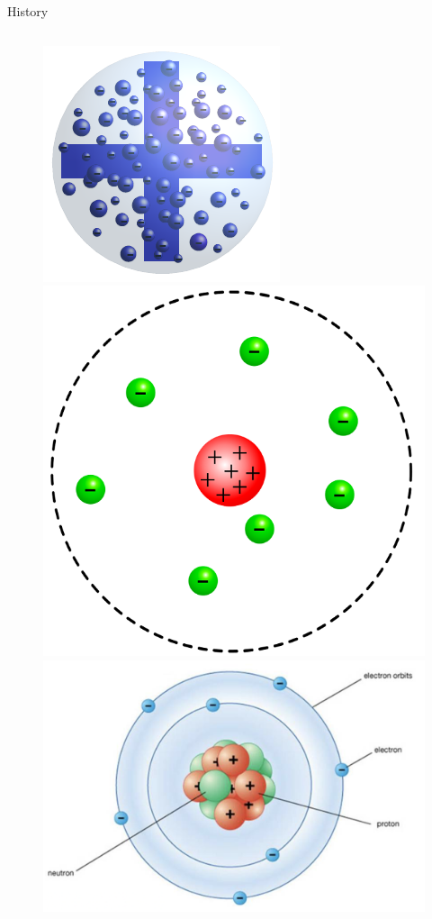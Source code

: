 \documentclass[10pt]{beamer}
\begin{document}
\begin{frame}{History}
\begin{columns}
\begin{column}{0.2\textwidth}
\begin{figure}
                \includegraphics[height=0.25\textheight]{figures/Plum_pudding_model.png}\\
                \includegraphics[height=0.25\textheight]{figures/Rutherford_model.png}\\
                \includegraphics[height=0.18\textheight]{figures/Bohr_model.png}
            \end{figure}
        \end{column}
    \end{columns}
\end{frame}
\end{document}

